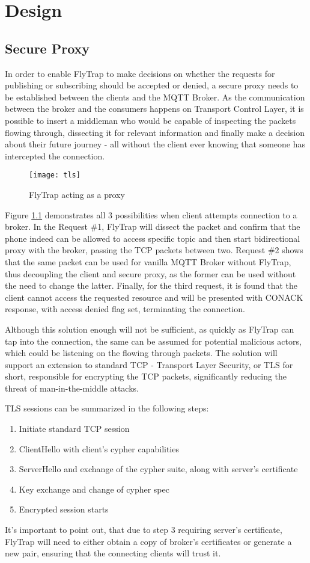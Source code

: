 \chapter{Design\label{chap:design}}

\section{Secure Proxy}
In order to enable FlyTrap to make decisions on whether the requests for publishing or subscribing should be accepted or denied, a secure proxy needs to be established between the clients and the MQTT Broker. As the communication between the broker and the consumers happens on Transport Control Layer, it is possible to insert a middleman who would be capable of inspecting the packets flowing through, dissecting it for relevant information and finally make a decision about their future journey - all without the client ever knowing that someone has intercepted the connection. 
\begin{figure}[h]
    \centering
    \texttt{[image: tls]}
    \caption{FlyTrap acting as a proxy}
    \label{fig:tls}
\end{figure}

Figure \ref{fig:tls} demonstrates all 3 possibilities when client attempts connection to a broker. In the Request \#1, FlyTrap will dissect the packet and confirm that the phone indeed can be allowed to access specific topic and then start bidirectional proxy with the broker, passing the TCP packets between two. Request \#2 shows that the same packet can be used for vanilla MQTT Broker without FlyTrap, thus decoupling the client and secure proxy, as the former can be used without the need to change the latter. Finally, for the third request, it is found that the client cannot access the requested resource and will be presented with CONACK response, with access denied flag set, terminating the connection.

Although this solution enough will not be sufficient, as quickly as FlyTrap can tap into the connection, the same can be assumed for potential malicious actors, which could be listening on the flowing through packets. The solution will support an extension to standard TCP - Transport Layer Security, or TLS for short, responsible for encrypting the TCP packets, significantly reducing the threat of man-in-the-middle attacks.

TLS sessions can be summarized in the following steps:
\begin{enumerate}
\item Initiate standard TCP session
\item ClientHello with client's cypher capabilities 
\item ServerHello and exchange of the cypher suite, along with server's certificate
\item Key exchange and change of cypher spec
\item Encrypted session starts
\end{enumerate}

It's important to point out, that due to step 3 requiring server's certificate, FlyTrap will need to either obtain a copy of broker's certificates or generate a new pair, ensuring that the connecting clients will trust it.


